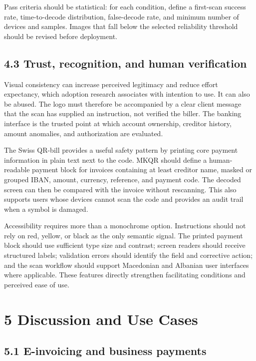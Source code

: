 Pass criteria should be statistical: for each condition, define a first-scan success rate, time-to-decode distribution, false-decode rate, and minimum number of devices and samples. Images that fall below the selected reliability threshold should be revised before deployment.

\subsection{4.3 Trust, recognition, and human verification}

Visual consistency can increase perceived legitimacy and reduce effort expectancy, which adoption research associates with intention to use. It can also be abused. The logo must therefore be accompanied by a clear client message that the scan has supplied an instruction, not verified the biller. The banking interface is the trusted point at which account ownership, creditor history, amount anomalies, and authorization are evaluated.

The Swiss QR-bill provides a useful safety pattern by printing core payment information in plain text next to the code. MKQR should define a human-readable payment block for invoices containing at least creditor name, masked or grouped IBAN, amount, currency, reference, and payment code. The decoded screen can then be compared with the invoice without rescanning. This also supports users whose devices cannot scan the code and provides an audit trail when a symbol is damaged.

Accessibility requires more than a monochrome option. Instructions should not rely on red, yellow, or black as the only semantic signal. The printed payment block should use sufficient type size and contrast; screen readers should receive structured labels; validation errors should identify the field and corrective action; and the scan workflow should support Macedonian and Albanian user interfaces where applicable. These features directly strengthen facilitating conditions and perceived ease of use.

\section{5 Discussion and Use Cases}

\subsection{5.1 E-invoicing and business payments}

